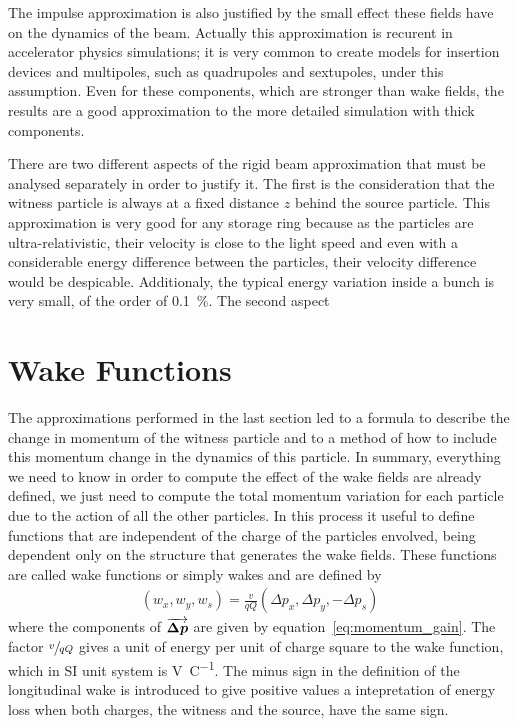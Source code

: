 \documentclass[
	12pt,				%
	openright,			%
	oneside,			%
	a4paper,		%
	chapter=TITLE,		%
	section=TITLE,		%
    brazil,				%
	english,			%
	sumario=tradicional,
	]{abntex2}
\begin{document}
  The impulse approximation is also justified by the small effect these fields have on the dynamics of the beam. Actually this approximation is recurent in accelerator physics simulations; it is very common to create models for insertion devices and multipoles, such as quadrupoles and sextupoles, under this assumption. Even for these components, which are stronger than wake fields, the results are a good approximation to the more detailed simulation with thick components.

  There are two different aspects of the rigid beam approximation that must be analysed separately in order to justify it. The first is the consideration that the witness particle is always at a fixed distance $z$ behind the source particle. This approximation is very good for any storage ring because as the particles are ultra-relativistic, their velocity is close to the light speed and even with a considerable energy difference between the particles, their velocity difference would be despicable. Additionaly, the typical energy variation inside a bunch is very small, of the order of \SI{0.1}{\percent}. {\huge The second aspect}

  \section{Wake Functions}\label{sec:wake_functions}

  The approximations performed in the last section led to a formula to describe the change in momentum of the witness particle and to a method of how to include this momentum change in the dynamics of this particle. In summary, everything we need to know in order to compute the effect of the wake fields are already defined, we just need to compute the total momentum variation for each particle due to the action of all the other particles. In this process it useful to define functions that are independent of the charge of the particles envolved, being dependent only on the structure that generates the wake fields. These functions are called wake functions or simply wakes and are defined by
  \begin{align}\label{eq:wake_definition}
	  \left(w_x, w_y, w_s\right) =
	  \frac{v}{qQ} \left(\Delta p_x, \Delta p_y, -\Delta p_s\right)
  \end{align}
  where the components of $\overrightarrow{\boldsymbol{\Delta p}}$ are given by equation~\eqref{eq:momentum_gain}. The factor $\sfrac{v}{qQ}$ gives a unit of energy per unit of charge square to the wake function, which in SI unit system is \si{\volt\per\coulomb}.  The minus sign in the definition of the longitudinal wake is introduced to give positive values a intepretation of energy loss when both charges, the witness and the source, have the same sign.
\end{document}
